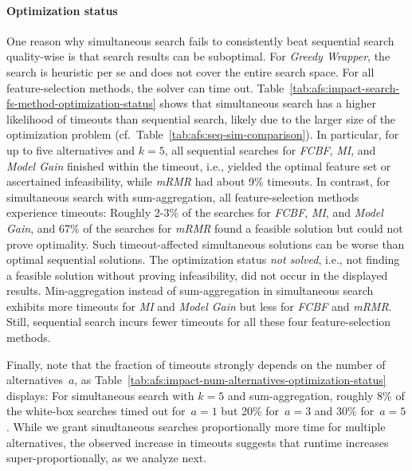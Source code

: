 \documentclass{article}
\theoremstyle{definition}
\begin{document}
\paragraph{Optimization status}

One reason why simultaneous search fails to consistently beat sequential search quality-wise is that search results can be suboptimal.
For \emph{Greedy Wrapper}, the search is heuristic per se and does not cover the entire search space.
For all feature-selection methods, the solver can time out.
Table~\ref{tab:afs:impact-search-fs-method-optimization-status} shows that simultaneous search has a higher likelihood of timeouts than sequential search, likely due to the larger size of the optimization problem (cf.~Table~\ref{tab:afs:seq-sim-comparison}).
In particular, for up to five alternatives and $k=5$, all sequential searches for \emph{FCBF}, \emph{MI}, and \emph{Model Gain} finished within the timeout, i.e., yielded the optimal feature set or ascertained infeasibility, while \emph{mRMR} had about 9\% timeouts.
In contrast, for simultaneous search with sum-aggregation, all feature-selection methods experience timeouts:
Roughly 2-3\% of the searches for \emph{FCBF}, \emph{MI}, and \emph{Model Gain}, and 67\% of the searches for \emph{mRMR} found a feasible solution but could not prove optimality.
Such timeout-affected simultaneous solutions can be worse than optimal sequential solutions.
The optimization status \emph{not solved}, i.e., not finding a feasible solution without proving infeasibility, did not occur in the displayed results.
Min-aggregation instead of sum-aggregation in simultaneous search exhibits more timeouts for \emph{MI} and \emph{Model Gain} but less for \emph{FCBF} and \emph{mRMR}.
Still, sequential search incurs fewer timeouts for all these four feature-selection methods.

Finally, note that the fraction of timeouts strongly depends on the number of alternatives~$a$, as Table~\ref{tab:afs:impact-num-alternatives-optimization-status} displays:
For simultaneous search with $k=5$ and sum-aggregation, roughly 8\% of the white-box searches timed out for~$a=1$ but 20\% for~$a=3$ and 30\% for~$a=5$.
While we grant simultaneous searches proportionally more time for multiple alternatives, the observed increase in timeouts suggests that runtime increases super-proportionally, as we analyze next.
\end{document}
